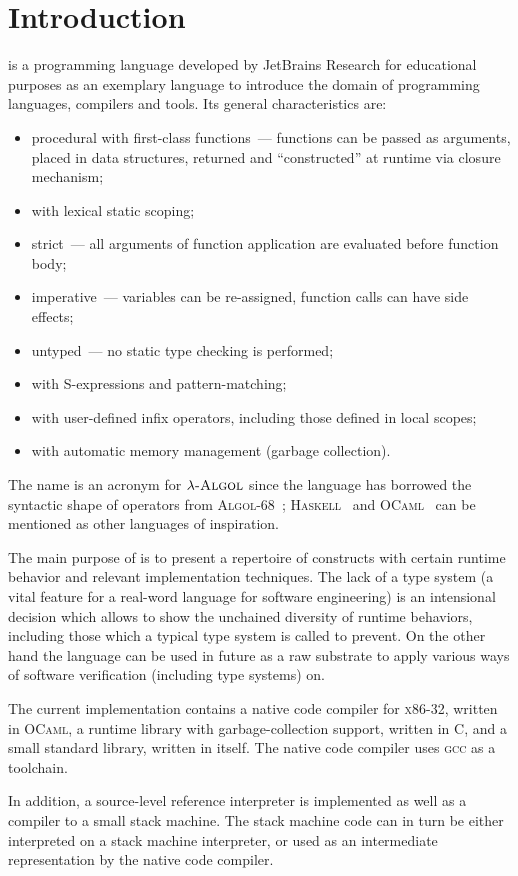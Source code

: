 \chapter{Introduction}

\lama is a programming language developed by JetBrains Research for educational purposes as an exemplary language to introduce
the domain of programming languages, compilers and tools. Its general characteristics are:

\begin{itemize}
\item procedural with first-class functions~--- functions can be passed as arguments, placed in data structures,
  returned and ``constructed'' at runtime via closure mechanism;
\item with lexical static scoping;
\item strict~--- all arguments of function application are evaluated before function body;
\item imperative~--- variables can be re-assigned, function calls can have side effects;
\item untyped~--- no static type checking is performed;
\item with S-expressions and pattern-matching;
\item with user-defined infix operators, including those defined in local scopes;
\item with automatic memory management (garbage collection).
\end{itemize}

The name \lama is an acronym for $\lambda\textsc{-Algol}$ since the language has borrowed the syntactic shape of
operators from \textsc{Algol-68}~\cite{A68}; \textsc{Haskell}~\cite{haskell} and \textsc{OCaml}~\cite{ocaml} can be
mentioned as other languages of inspiration.

The main purpose of \lama is to present a repertoire of constructs with certain runtime behavior and
relevant implementation techniques. The lack of a type system (a vital feature for a real-word language
for software engineering) is an intensional decision which allows to show the unchained diversity
of runtime behaviors, including those which a typical type system is called to prevent. On the other hand
the language can be used in future as a raw substrate to apply various ways of software verification (including
type systems) on.

The current implementation contains a native code compiler for \textsc{x86-32}, written
in \textsc{OCaml}, a runtime library with garbage-collection support, written in \textsc{C}, and a small
standard library, written in \lama itself. The native code compiler uses \textsc{gcc} as a toolchain.

In addition, a source-level reference interpreter is implemented as well as a compiler to a small
stack machine. The stack machine code can in turn be either interpreted on a stack machine interpreter, or
used as an intermediate representation by the native code compiler.

%
%
%
